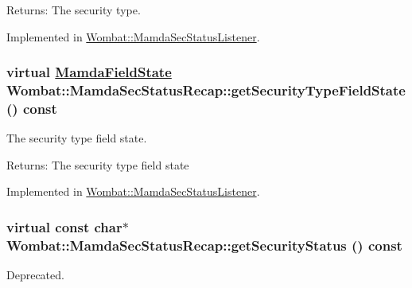 \begin{Desc}
\item[Returns:]The security type. \end{Desc}


Implemented in \hyperlink{classWombat_1_1MamdaSecStatusListener_2f643f3f70d52943af0b2ac011c1fa3b}{Wombat::Mamda\-Sec\-Status\-Listener}.\hypertarget{classWombat_1_1MamdaSecStatusRecap_89f057289668aaca75848986d4e8a386}{
\subsubsection[getSecurityTypeFieldState]{\setlength{\rightskip}{0pt plus 5cm}virtual \hyperlink{namespaceWombat_93aac974f2ab713554fd12a1fa3b7d2a}{Mamda\-Field\-State} Wombat::Mamda\-Sec\-Status\-Recap::get\-Security\-Type\-Field\-State () const}}
\label{classWombat_1_1MamdaSecStatusRecap_89f057289668aaca75848986d4e8a386}


The security type field state. 

\begin{Desc}
\item[Returns:]The security type field state \end{Desc}


Implemented in \hyperlink{classWombat_1_1MamdaSecStatusListener_61d631913cca79d7919a225c9d42e5d1}{Wombat::Mamda\-Sec\-Status\-Listener}.\hypertarget{classWombat_1_1MamdaSecStatusRecap_d7bd3380fa057d4de729bff89d649b57}{
\subsubsection[getSecurityStatus]{\setlength{\rightskip}{0pt plus 5cm}virtual const char$\ast$ Wombat::Mamda\-Sec\-Status\-Recap::get\-Security\-Status () const}}
\label{classWombat_1_1MamdaSecStatusRecap_d7bd3380fa057d4de729bff89d649b57}


Deprecated. 


